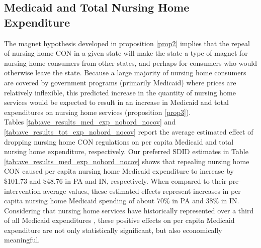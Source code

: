 \documentclass[../Main.tex]{subfiles}
\begin{document}
\subsection{Medicaid and Total Nursing Home Expenditure}

The magnet hypothesis developed in proposition \ref{prop2} implies that the repeal of nursing home CON in a given state will make the state a type of magnet for nursing home consumers from other states, and perhaps for consumers who would otherwise leave the state. Because a large majority of nursing home consumers are covered by government programs (primarily Medicaid) where prices are relatively inflexible, this predicted increase in the quantity of nursing home services would be expected to result in an increase in Medicaid and total expenditures on nursing home services (proposition \ref{prop3}).\\ 
\indent Tables \ref{tab:ave_results_med_exp_nobord_nocov} and \ref{tab:ave_results_tot_exp_nobord_nocov} report the average estimated effect of dropping nursing home CON regulations on per capita Medicaid and total nursing home expenditure, respectively. Our preferred SDID estimates in Table \ref{tab:ave_results_med_exp_nobord_nocov} shows that repealing nursing home CON caused per capita nursing home Medicaid expenditure to increase by \$101.73 and \$48.76 in PA and IN, respectively. When compared to their pre-intervention average values, these estimated effects represent increases in per capita nursing home Medicaid spending of about 70\% in PA and 38\% in IN. Considering that nursing home services have historically represented over a third of all Medicaid expenditures \citep{wiener1999controlling}, these positive effects on per capita Medicaid expenditure are not only statistically significant, but also economically meaningful. 
\end{document}
